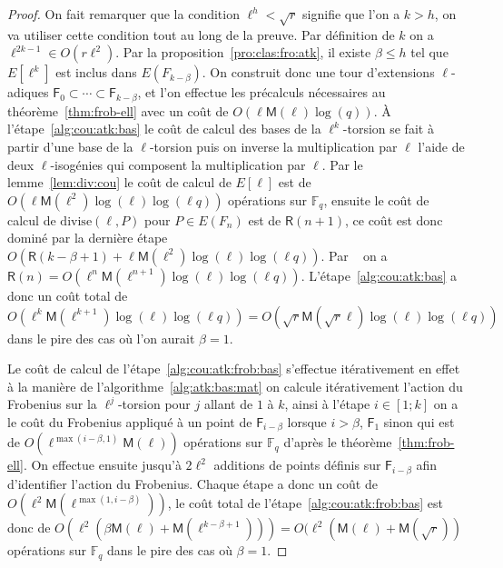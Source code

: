 \documentclass[10pt,a4paper]{book}
\theoremstyle{plain}
\theoremstyle{definition}
\theoremstyle{definition}
\theoremstyle{definition}
\theoremstyle{definition}
\theoremstyle{remark}
\theoremstyle{remark}
\theoremstyle{definition}
\begin{document}
\begin{proof}
On fait remarquer que la condition $\ell^h < \sqrt{r}$ signifie que l'on
a $k>h$, on va utiliser cette condition tout au long de la preuve.
Par définition de $k$ on a $\ell^{2k-1} \in O(r\ell^2)$.
Par la proposition~\ref{pro:clas:fro:atk}, il existe $\beta \leqslant h$ tel que
$E[\ell^k]$ est inclus dans $E(F_{k-\beta})$. On construit donc une
tour d'extensions $\ell$-adiques $\mathsf{F}_0\subset\cdots\subset 
\mathsf{F}_{k-\beta}$, et l'on effectue les précalculs nécessaires au 
théorème~\ref{thm:frob-ell} avec un coût de $O(\ell\mathsf{M}(\ell)\log(q))$.
\`A l'étape~\ref{alg:cou:atk:bas} le coût de calcul des bases de la 
$\ell^k$-torsion se fait à partir d'une base de la $\ell$-torsion puis on 
inverse la multiplication par $\ell$ l'aide de deux $\ell$-isogénies qui 
composent la multiplication par $\ell$. Par le lemme~\ref{lem:div:cou} le coût 
de calcul de $E[\ell]$ est de 
$O(\ell \mathsf{M}(\ell^2)\log(\ell)\log(\ell q))$ opérations sur 
$\mathbb{F}_q$, ensuite le coût de calcul de $\mathrm{divise}(\ell,P)$ pour 
$P \in E(F_n)$ est de $\mathsf{R}(n+1)$, ce coût est donc dominé par la 
dernière étape
$O(\mathsf{R}(k-\beta+1)+\ell \mathsf{M}(\ell^2)\log(\ell)\log(\ell q))$.
Par ~\cite[Chapter~14.5]{vzGJG03} on a $\mathsf{R}(n)=
O(\ell^n\mathsf{M}(\ell^{n+1})\log(\ell)\log(\ell q))$. 
L'étape~\ref{alg:cou:atk:bas} a donc un coût total de $O(\ell^k \mathsf{M}
(\ell^{k+1})\log(\ell)\log(\ell q))=O(\sqrt{r}\mathsf{M}(\sqrt{r}\ell)\log(\ell)\log(\ell q))$ 
dans le pire des cas où l'on aurait $\beta=1$.

Le coût de calcul de l'étape~\ref{alg:cou:atk:frob:bas} s'effectue 
itérativement en effet à la manière de l'algorithme~\ref{alg:atk:bas:mat} on 
calcule itérativement l'action du Frobenius sur la $\ell^j$-torsion pour $j$ 
allant de $1$ à $k$, ainsi à l'étape $i \in [1;k]$ on a le coût du Frobenius
appliqué à un point de $\mathsf{F}_{i-\beta}$ lorsque $i>\beta$, $\mathsf{F}_1$
sinon qui est de $O(\ell^{\max(i-\beta,1)}\mathsf{M}(\ell))$ opérations sur 
$\mathbb{F}_q$ d'après le théorème~\ref{thm:frob-ell}. On effectue ensuite 
jusqu'à $2\ell^2$ additions de points définis sur $\mathsf{F}_{i-\beta}$ afin 
d'identifier l'action du Frobenius. Chaque étape a donc un coût de 
$O(\ell^2 \mathsf{M}(\ell^{\max(1,i-\beta)}))$,
le coût total de l'étape~\ref{alg:cou:atk:frob:bas} est donc de 
$O(\ell^2(\beta \mathsf{M}(\ell)+\mathsf{M}(\ell^{k-\beta+1})))=
O(\ell^2( \mathsf{M}(\ell)+\mathsf{M}(\sqrt{r}))$ 
opérations sur $\mathbb{F}_q$ dans le pire des cas où $\beta=1$.


\end{proof}
\end{document}
